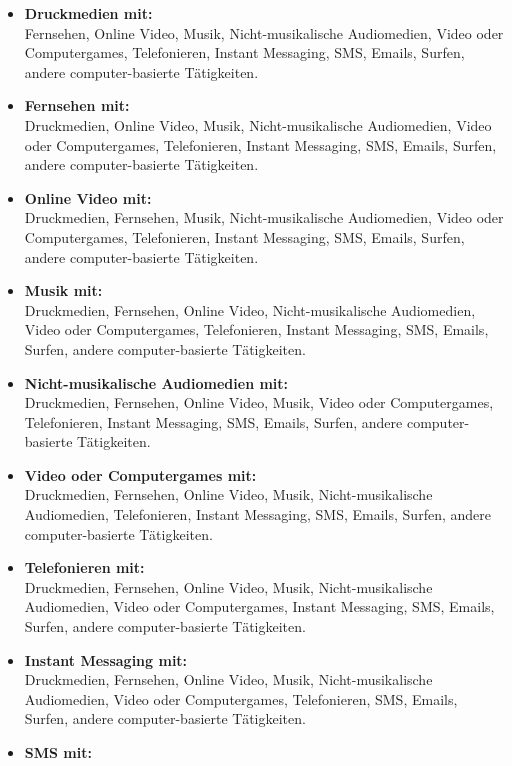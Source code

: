     \begin{itemize}
        \item \textbf{Druckmedien mit:}\\
Fernsehen, Online Video, Musik, Nicht-musikalische Audiomedien, Video oder Computergames, Telefonieren, Instant Messaging, SMS, Emails, Surfen, andere computer-basierte Tätigkeiten.
        \item \textbf{Fernsehen mit:}\\
Druckmedien, Online Video, Musik, Nicht-musikalische Audiomedien, Video oder Computergames, Telefonieren, Instant Messaging, SMS, Emails, Surfen, andere computer-basierte Tätigkeiten.
        \item \textbf{Online Video mit:}\\
Druckmedien, Fernsehen, Musik, Nicht-musikalische Audiomedien, Video oder Computergames, Telefonieren, Instant Messaging, SMS, Emails, Surfen, andere computer-basierte Tätigkeiten. 
        \item \textbf{Musik mit:}\\
Druckmedien, Fernsehen, Online Video, Nicht-musikalische Audiomedien, Video oder Computergames, Telefonieren, Instant Messaging, SMS, Emails, Surfen, andere computer-basierte Tätigkeiten. 
        \item \textbf{Nicht-musikalische Audiomedien mit:}\\
Druckmedien, Fernsehen, Online Video, Musik, Video oder Computergames, Telefonieren, Instant Messaging, SMS, Emails, Surfen, andere computer-basierte Tätigkeiten. 
        \item \textbf{Video oder Computergames mit:}\\
Druckmedien, Fernsehen, Online Video, Musik, Nicht-musikalische Audiomedien, Telefonieren, Instant Messaging, SMS, Emails, Surfen, andere computer-basierte Tätigkeiten. 
        \item \textbf{Telefonieren mit:}\\
Druckmedien, Fernsehen, Online Video, Musik, Nicht-musikalische Audiomedien, Video oder Computergames, Instant Messaging, SMS, Emails, Surfen, andere computer-basierte Tätigkeiten. 
        \item \textbf{Instant Messaging mit:}\\
Druckmedien, Fernsehen, Online Video, Musik, Nicht-musikalische Audiomedien, Video oder Computergames, Telefonieren, SMS, Emails, Surfen, andere computer-basierte Tätigkeiten. 
        \item \textbf{SMS mit:}\\

\end{itemize}
